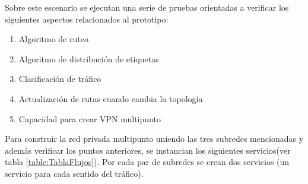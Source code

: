 Sobre este escenario se ejecutan una serie de pruebas orientadas a verificar los siguientes aspectos relacionados al prototipo:

\begin{enumerate}
\item Algoritmo de ruteo
\item Algoritmo de distribución de etiquetas
\item Clasificaci\'on de tr\'afico
\item Actualizaci\'on de rutas cuando cambia la topolog\'ia
\item Capacidad para crear VPN multipunto
\end{enumerate}

Para construir la red privada multipunto uniendo las tres subredes mencionadas y adem\'as verificar los puntos anteriores, se instancian los siguientes servicios(ver tabla \ref{table:TablaFlujos}). Por cada par de subredes se crean dos servicios (un servicio para cada sentido del tr\'afico).\\


